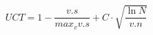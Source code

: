 \documentclass[11pt]{article}
\begin{document}
\begin{equation}
    UCT = 1 - \frac{v.s}{max_v v.s} + C \cdot \sqrt{\frac{\ln N}{v.n}}
\end{equation}


\end{document}
